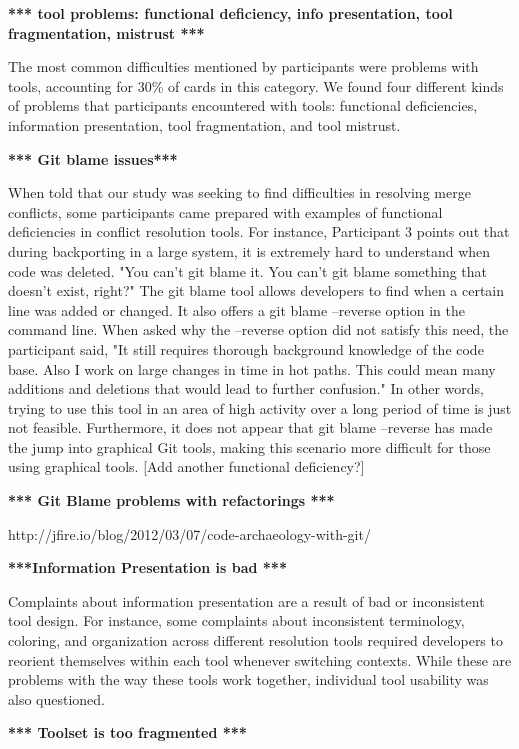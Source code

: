 \documentclass[conference]{IEEEtran}
\begin{document}
\textbf{*** tool problems: functional deficiency, info presentation, tool fragmentation,  mistrust ***}

The most common difficulties mentioned by participants were problems with tools, accounting for 30\% of cards in this category. We found four different kinds of problems that participants encountered with tools: functional deficiencies, information presentation, tool fragmentation, and tool mistrust. 

\textbf{*** Git blame issues***}

When told that our study was seeking to find difficulties in resolving merge conflicts, some participants came prepared with examples of functional deficiencies in conflict resolution tools. For instance, Participant 3 points out that during backporting in a large system, it is extremely hard to understand when code was deleted. "You can't git blame it. You can't git blame something that doesn't exist, right?" 
The git blame tool allows developers to find when a certain line was added or changed. It also offers a git blame --reverse option in the command line. When asked why the --reverse option did not satisfy this need, the participant said, "It still requires thorough background knowledge of the code base. Also I work on large changes in time in hot paths. This could mean many additions and deletions that would lead to further confusion." In other words, trying to use this tool in an area of high activity over a long period of time is just not feasible. Furthermore, it does not appear that git blame --reverse has made the jump into graphical Git tools, making this scenario more difficult for those using graphical tools. [Add another functional deficiency?]

\textbf{*** Git Blame problems with refactorings ***}

http://jfire.io/blog/2012/03/07/code-archaeology-with-git/

\textbf{***Information Presentation is bad ***}

Complaints about information presentation are a result of bad or inconsistent tool design. For instance, some complaints about inconsistent terminology, coloring, and organization across different resolution tools required developers to reorient themselves within each tool whenever switching contexts. While these are problems with the way these tools work together, individual tool usability was also questioned.

\textbf{*** Toolset is too fragmented ***}
\end{document}
